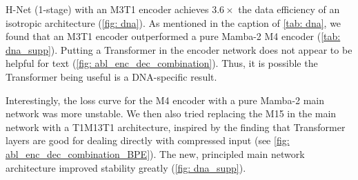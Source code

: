 \documentclass{article}
\newcommand{\model}{H-Net}
\newcommand{\encoder}{encoder network}
\newcommand{\main}{main network}
\theoremstyle{plain}
\theoremstyle{remark}
\begin{document}
\label{sec: dna_supp}
\model{} (1-stage) with an \colorbox{EncDec0}{M3T1} encoder achieves $3.6\times$ the data efficiency of an isotropic architecture (\cref{fig: dna}).
As mentioned in the caption of \cref{tab: dna}, we found that an \colorbox{EncDec0}{M3T1} encoder outperformed a pure Mamba-2 \colorbox{EncDec0}{M4} encoder (\cref{tab: dna_supp}).
Putting a Transformer in the \encoder{} does not appear to be helpful for text (\cref{fig: abl_enc_dec_combination}). 
Thus, it is possible the Transformer being useful is a DNA-specific result.

Interestingly, the loss curve for the \colorbox{EncDec0}{M4} encoder with a pure Mamba-2 \main{} was more unstable.
We then also tried replacing the \colorbox{Main}{M15} in the \main{} with a \colorbox{Main}{T1M13T1} architecture,
inspired by the finding that Transformer layers are good for dealing directly with compressed input (see \cref{fig: abl_enc_dec_combination_BPE}).
The new, principled \main{} architecture improved stability greatly (\cref{fig: dna_supp}).
\end{document}
